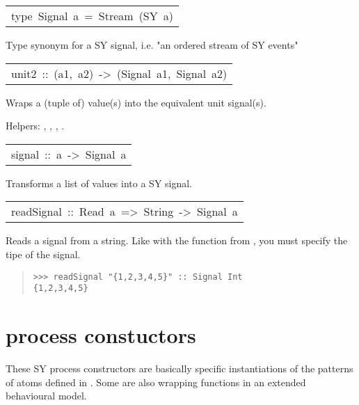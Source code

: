 \begin{haddockdesc}
\item[\begin{tabular}{@{}l}
type\ Signal\ a\ =\ Stream\ (SY\ a)
\end{tabular}]\haddockbegindoc
Type synonym for a SY signal, i.e. "an ordered stream of SY
 events"\par

\end{haddockdesc}
\begin{haddockdesc}
\item[\begin{tabular}{@{}l}
unit2\ ::\ (a1,\ a2)\ ->\ (Signal\ a1,\ Signal\ a2)
\end{tabular}]\haddockbegindoc
Wraps a (tuple of) value(s) into the equivalent unit signal(s).\par
Helpers: , , , .\par

\end{haddockdesc}
\begin{haddockdesc}
\item[\begin{tabular}{@{}l}
signal\ ::\ {\char 91}a{\char 93}\ ->\ Signal\ a
\end{tabular}]\haddockbegindoc
Transforms a list of values into a SY signal.\par

\end{haddockdesc}
\begin{haddockdesc}
\item[\begin{tabular}{@{}l}
readSignal\ ::\ Read\ a\ =>\ String\ ->\ Signal\ a
\end{tabular}]\haddockbegindoc
Reads a signal from a string. Like with the  function from
 , you must specify the tipe of the signal.\par
\begin{quote}
{\haddockverb\begin{verbatim}
>>> readSignal "{1,2,3,4,5}" :: Signal Int
{1,2,3,4,5}

\end{verbatim}}
\end{quote}
\end{haddockdesc}
\section{ process constuctors}
These SY process constructors are basically specific
 instantiations of the patterns of atoms defined in
 . Some are also wrapping functions in an
 extended behavioural model.\par

